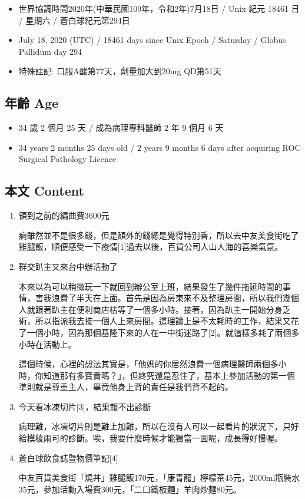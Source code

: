 \documentclass[a5paper, 11pt
]{book}
\providecommand{\tightlist}{%
  \setlength{\itemsep}{0pt}\setlength{\parskip}{0pt}}
\begin{document}
\begin{itemize}
\tightlist
\item
  世界協調時間2020年(中華民國109年，令和2年)7月18日 / Unix 紀元 18461 日
  / 星期六 / 蒼白球紀元第294日
\item
  July 18, 2020 (UTC) / 18461 days since Unix Epoch / Saturday / Globus
  Pallidum day 294
\item
  特殊註記: 口服A酸第77天，劑量加大到20mg QD第51天
\end{itemize}

\hypertarget{ux5e74ux9f61-age-42}{%
\subsection{年齡 Age}\label{ux5e74ux9f61-age-42}}

\begin{itemize}
\tightlist
\item
  34 歲 2 個月 25 天 / 成為病理專科醫師 2 年 9 個月 6 天
\item
  34 years 2 months 25 days old / 2 years 9 months 6 days after
  acquiring ROC Surgical Pathology Licence
\end{itemize}

\hypertarget{ux672cux6587-content-42}{%
\subsection{本文 Content}\label{ux672cux6587-content-42}}

\begin{enumerate}
\def\labelenumi{\arabic{enumi}.}
\item
  領到之前的編曲費3600元

  痾雖然並不是很多錢，但是額外的錢總是覺得特別香，所以去中友美食街吃了雞腿飯，順便感受一下疫情{[}1{]}過去以後，百貨公司人山人海的喜樂氣氛。
\item
  群交趴主又來台中辦活動了

  本來以為可以稍微玩一下就回到辦公室上班，結果發生了幾件拖延時間的事情，害我浪費了半天在上面。首先是因為房東來不及整理房間，所以我們幾個人就跟著趴主在便利商店枯等了一個多小時。接著，因為趴主一開始分身乏術，所以指派我去接一個人上來房間。這理論上是不太耗時的工作，結果又花了一個小時，因為那個基隆下來的人在一中街迷路了{[}2{]}。就這樣多耗了兩個多小時在活動上。

  這個時候，心裡的想法其實是，「他媽的你居然浪費一個病理醫師兩個多小時，你知道那有多寶貴嗎？」，但終究還是忍住了，基本上參加活動的第一個準則就是尊重主人，畢竟他身上背的責任是我們背不起的。
\item
  今天看冰凍切片{[}3{]}，結果報不出診斷

  病理難，冰凍切片則是難上加難，所以在沒有人可以一起看片的狀況下，只好給模稜兩可的診斷。唉，我要什麼時候才能獨當一面呢，成長得好慢喔。
\item
  蒼白球飲食誌暨物價筆記{[}4{]}

  中友百貨美食街「燒丼」雞腿飯170元，「康青龍」檸檬茶45元，2000ml瓶裝水35元，參加活動入場費300元，「二口鐵板麵」羊肉炒麵80元。
\end{enumerate}
\end{document}
